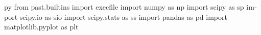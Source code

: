 \usepackage[headheight=14pt, top=0.5cm, bottom=0.5cm, left=.5cm, right=.5cm]{geometry}

\usepackage{fontspec}

\usepackage{polyglossia}
\setdefaultlanguage{english}
\usepackage{amsmath, amssymb}
\usepackage{graphicx}
\usepackage{pgf}
\usepackage{import}

\usepackage[outputdir=build]{minted}
\usepackage{minted}


\usepackage{pythontex}
\begin{pythontexcustomcode}{py}
from past.builtins import execfile
import numpy as np
import scipy as sp
import scipy.io as sio
import scipy.stats as ss
import pandas as pd
import matplotlib.pyplot as plt
\end{pythontexcustomcode}



\setlength\parindent{0pt}
